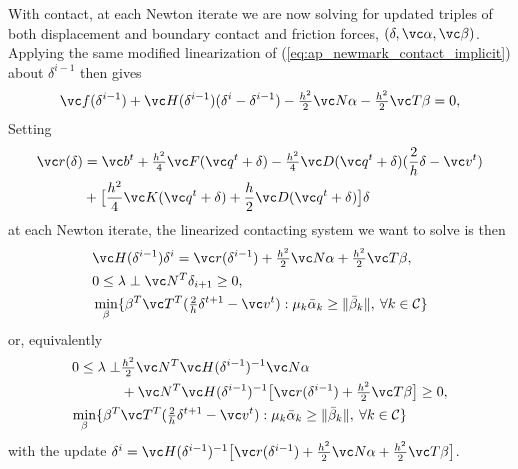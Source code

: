 With contact, at each Newton iterate we are now solving for updated triples of both displacement and boundary contact and friction forces, $(\delta, \vc \alpha, \vc \beta)$. 
Applying the same modified linearization of (\ref{eq:ap_newmark_contact_implicit}) about $\delta^{i-1}$ then gives 
\begin{align}
\vc f(\delta^{i-1}) + \vc H(\delta^{i-1}) (\delta^i - \delta^{i-1}) - \tfrac{h^2}{2} \vc N \alpha -  \tfrac{h^2}{2}  \vc T \beta = 0,
\end{align}
Setting 
\begin{align}
\begin{split}
\vc r(\delta) &=  \vc b^t + \tfrac{h^2}{4} \vc F(\vc q^{t} + \delta) - \tfrac{h^2}{4} \vc D(\vc q^{t} + \delta) (\frac{2}{h}\delta - \vc v^{t}) \\
& +  \big[ \frac{h^2}{4} \vc K(\vc q^{t}+\delta) + \frac{h}{2} \vc D(\vc q^{t} + \delta) \big] \delta 
\end{split}
\end{align}
at each Newton iterate, the linearized contacting system we want to solve is then 
\begin{align}
\begin{split}
& \vc H(\delta^{i-1}) \delta^i =  \vc r(\delta^{i-1}) + \tfrac{h^2}{2} \vc N \alpha +  \tfrac{h^2}{2}  \vc T \beta,\\
& 0 \leq \lambda \perp \vc N^T \delta_{i+1} \geq 0,\\
& \min_{\beta} \{ \beta^T \vc T^T (\tfrac{2}{h} \delta^{t+1} - \vc v^t) : \mu_k \bar{\alpha}_k \geq \|\bar{\beta}_k\|, \> \forall k \in \mathcal{C} \}
\end{split}
\end{align}
or, equivalently 
\begin{align}
\begin{split}
0 \leq \lambda \perp & \tfrac{h^2}{2} \vc N^T \vc H(\delta^{i-1})^{-1}  \vc N \alpha  \\
&+ \vc N^T \vc H(\delta^{i-1})^{-1} \big[\vc r(\delta^{i-1}) +  \tfrac{h^2}{2}  \vc T \beta \big] \geq 0,\\
\min_{\beta} \{ \beta^T & \vc T^T (\tfrac{2}{h} \delta^{t+1} - \vc v^t) : \mu_k \bar{\alpha}_k \geq \|\bar{\beta}_k\|, \> \forall k \in \mathcal{C} \}
\end{split}
\end{align}
with the update $ \delta^i =  \vc H(\delta^{i-1})^{-1} \big[\vc r(\delta^{i-1}) + \tfrac{h^2}{2} \vc N \alpha +  \tfrac{h^2}{2}  \vc T \beta \big]$.

